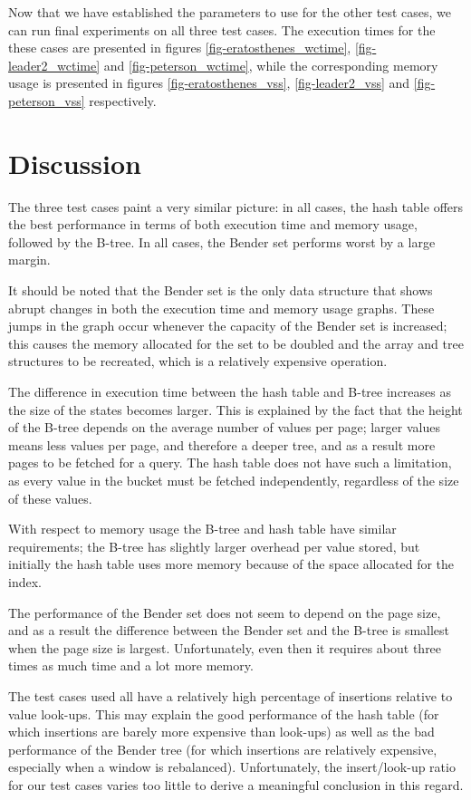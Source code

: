 \documentclass{acm_proc_article-sp}
\begin{document}
Now that we have established the parameters to use for the other test cases,
we can run final experiments on all three test cases.
The execution times for the these cases are presented in figures
\ref{fig-eratosthenes_wctime}, \ref{fig-leader2_wctime} and
\ref{fig-peterson_wctime}, while the corresponding memory usage is presented in
figures \ref{fig-eratosthenes_vss}, \ref{fig-leader2_vss} and \ref{fig-peterson_vss} respectively.

\section{Discussion}
The three test cases paint a very similar picture: in all cases, the hash table
offers the best performance in terms of both execution time and memory usage,
followed by the B-tree. In all cases, the Bender set performs worst by a large
margin.

It should be noted that the Bender set is the only data structure that shows
abrupt changes in both the execution time and memory usage graphs. These
jumps in the graph occur whenever the capacity of the Bender set is increased;
this causes the memory allocated for the set to be doubled and the array and
tree structures to be recreated, which is a relatively expensive operation.

The difference in execution time between the hash table and B-tree increases as
the size of the states becomes larger. This is explained by the fact that the
height of the B-tree depends on the average number of values per page; larger
values means less values per page, and therefore a deeper tree, and as a
result more pages to be fetched for a query. The hash table does not have such a
limitation, as every value in the bucket must be fetched independently, regardless
of the size of these values.

With respect to memory usage the B-tree and hash table have similar requirements;
the B-tree has slightly larger overhead per value stored, but initially the hash
table uses more memory because of the space allocated for the index.

The performance of the Bender set does not seem to depend on the page size,
and as a result the difference between the Bender set and the B-tree is smallest
when the page size is largest. Unfortunately, even then it requires about three
times as much time and a lot more memory.

The test cases used all have a relatively high percentage of insertions relative
to value look-ups. This may explain the good performance of the hash table (for
which insertions are barely more expensive than look-ups) as well as the bad
performance of the Bender tree (for which insertions are relatively expensive,
especially when a window is rebalanced). Unfortunately, the insert/look-up
ratio for our test cases varies too little to derive a meaningful conclusion
in this regard.
\end{document}
